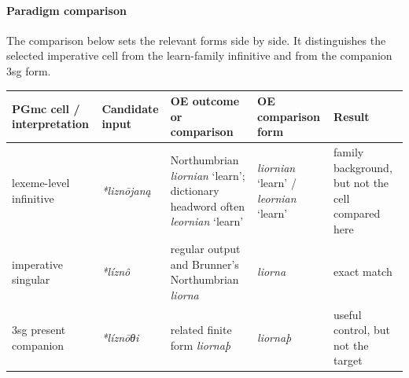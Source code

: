 \documentclass[
  british,
  a4paper,
]{article}
\newcounter{none} %
\begin{document}
\paragraph{Paradigm comparison}\label{paradigm-comparison-21}

The comparison below sets the relevant forms side by side. It
distinguishes the selected imperative cell from the learn-family
infinitive and from the companion 3sg form.

{\def\LTcaptype{none} %
\begin{longtable}[]{@{}
  >{\raggedright\arraybackslash}p{}
  >{\raggedright\arraybackslash}p{}
  >{\raggedright\arraybackslash}p{}
  >{\raggedright\arraybackslash}p{}
  >{\raggedright\arraybackslash}p{}@{}}
\toprule\noalign{}
\begin{minipage}[b]{\linewidth}\raggedright
PGmc cell / interpretation
\end{minipage} & \begin{minipage}[b]{\linewidth}\raggedright
Candidate input
\end{minipage} & \begin{minipage}[b]{\linewidth}\raggedright
OE outcome or comparison
\end{minipage} & \begin{minipage}[b]{\linewidth}\raggedright
OE comparison form
\end{minipage} & \begin{minipage}[b]{\linewidth}\raggedright
Result
\end{minipage} \\
\midrule\noalign{}
\endhead
\bottomrule\noalign{}
\endlastfoot
lexeme-level infinitive & {\emph{*liznōjaną}} & Northumbrian
{\emph{liornian}} `learn'; dictionary headword often {\emph{leornian}}
`learn' & {\emph{liornian}} `learn' / {\emph{leornian}} `learn' & family
background, but not the cell compared here \\
imperative singular & {\emph{*líznô}} & regular output and Brunner's
Northumbrian {\emph{liorna}} & {\emph{liorna}} & exact match \\
3sg present companion & {\emph{*líznōθi}} & related finite form
{\emph{liornaþ}} & {\emph{liornaþ}} & useful control, but not the
target \\
\end{longtable}
}
\end{document}
